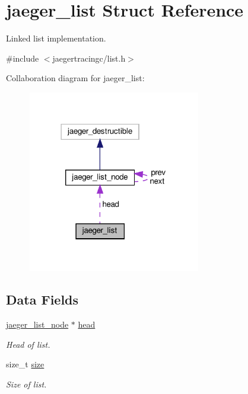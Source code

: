 \hypertarget{structjaeger__list}{}\section{jaeger\+\_\+list Struct Reference}
\label{structjaeger__list}


Linked list implementation.  




{\ttfamily \#include $<$jaegertracingc/list.\+h$>$}



Collaboration diagram for jaeger\+\_\+list\+:\nopagebreak
\begin{figure}[H]
\begin{center}
\leavevmode
\includegraphics[width=213pt]{structjaeger__list__coll__graph}
\end{center}
\end{figure}
\subsection*{Data Fields}
\begin{DoxyCompactItemize}
\item 
\mbox{\hyperlink{structjaeger__list__node}{jaeger\+\_\+list\+\_\+node}} $\ast$ \mbox{\hyperlink{structjaeger__list_ad5a459e896a2bd718d633c63fecf695a}{head}}
\begin{DoxyCompactList}\small\item\em Head of list. \end{DoxyCompactList}\item 
size\+\_\+t \mbox{\hyperlink{structjaeger__list_a8bb149f40b7a39dcaf99481570f91afc}{size}}
\begin{DoxyCompactList}\small\item\em Size of list. \end{DoxyCompactList}\end{DoxyCompactItemize}


